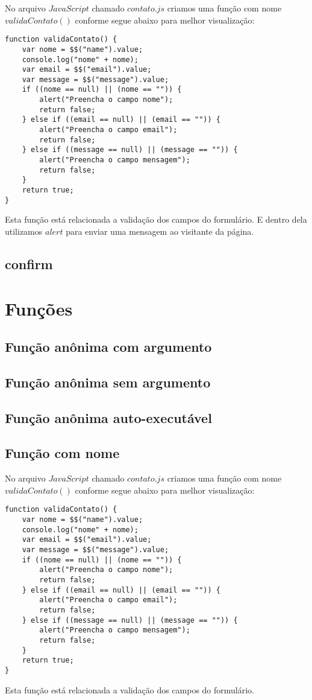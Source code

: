 	No arquivo $JavaScript$ chamado $contato.js$ criamos uma função com nome $validaContato()$ conforme segue abaixo para melhor visualização:
\begin{lstlisting}
function validaContato() {
    var nome = $$("name").value;
    console.log("nome" + nome);
    var email = $$("email").value;
    var message = $$("message").value;
    if ((nome == null) || (nome == "")) {
        alert("Preencha o campo nome");
        return false;
    } else if ((email == null) || (email == "")) {
        alert("Preencha o campo email");
        return false;
    } else if ((message == null) || (message == "")) {
        alert("Preencha o campo mensagem");
        return false;
    }
    return true;
}
\end{lstlisting}
	Esta função está relacionada a validação dos campos do formulário. E dentro dela utilizamos $alert$ para enviar uma mensagem ao visitante da página.

\subsection{confirm}

\section{Funções}
\subsection{Função anônima com argumento}
\subsection{Função anônima sem argumento}
\subsection{Função anônima auto-executável}
\subsection{Função com nome}
	No arquivo $JavaScript$ chamado $contato.js$ criamos uma função com nome $validaContato()$ conforme segue abaixo para melhor visualização:
\begin{lstlisting}
function validaContato() {
    var nome = $$("name").value;
    console.log("nome" + nome);
    var email = $$("email").value;
    var message = $$("message").value;
    if ((nome == null) || (nome == "")) {
        alert("Preencha o campo nome");
        return false;
    } else if ((email == null) || (email == "")) {
        alert("Preencha o campo email");
        return false;
    } else if ((message == null) || (message == "")) {
        alert("Preencha o campo mensagem");
        return false;
    }
    return true;
}
\end{lstlisting}
	Esta função está relacionada a validação dos campos do formulário.

